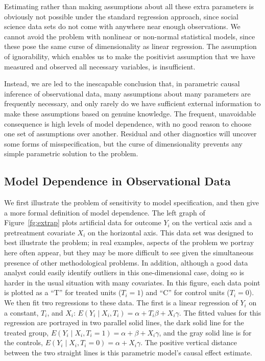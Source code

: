 \documentclass[11pt,titlepage]{article}
\begin{document}
Estimating rather than making assumptions about all these extra
parameters is obviously not possible under the standard regression
approach, since social science data sets do not come with anywhere
near enough observations.  We cannot avoid the problem with nonlinear
or non-normal statistical models, since these pose the same curse of
dimensionality as linear regression.  The assumption of ignorability,
which enables us to make the positivist assumption that we have
measured and observed all necessary variables, is insufficient.

Instead, we are led to the inescapable conclusion that, in parametric
causal inference of observational data, many assumptions about many
parameters are frequently necessary, and only rarely do we have
sufficient external information to make these assumptions based on
genuine knowledge.  The frequent, unavoidable consequence is high
levels of model dependence, with no good reason to choose one set of
assumptions over another.  Residual and other diagnostics will uncover
some forms of misspecification, but the curse of dimensionality
prevents any simple parametric solution to the problem.

\subsection{Model Dependence in Observational Data}\label{s:modeldep}

We first illustrate the problem of sensitivity to model specification,
and then give a more formal definition of model dependence.  The left
graph of Figure~\ref{fg:extrap} plots artificial data for outcome
$Y_i$ on the vertical axis and a pretreatment covariate $X_i$ on the
horizontal axis.  This data set was designed to best illustrate the
problem; in real examples, aspects of the problem we portray here
often appear, but they may be more difficult to see given the
simultaneous presence of other methodological problems.  In addition,
although a good data analyst could easily identify outliers in this
one-dimensional case, doing so is harder in the usual situation with
many covariates.  In this figure, each data point is plotted as a
``T'' for treated units ($T_i=1$) and ``C'' for control units
($T_i=0$).  We then fit two regressions to these data.  The first is a
linear regression of $Y_i$ on a constant, $T_i$, and $X_i$: $E(Y_i\mid
X_i,T_i)=\alpha + T_i\beta + X_i\gamma$.  The fitted values for this
regression are portrayed in two parallel solid lines, the dark solid
line for the treated group, $E(Y_i\mid X_i,
T_i=1)=\alpha+\beta+X_i\gamma$, and the gray solid line is for the
controls, $E(Y_i\mid X_i,T_i=0)=\alpha+X_i\gamma$.  The positive
vertical distance between the two straight lines is this parametric
model's causal effect estimate.
\end{document}
